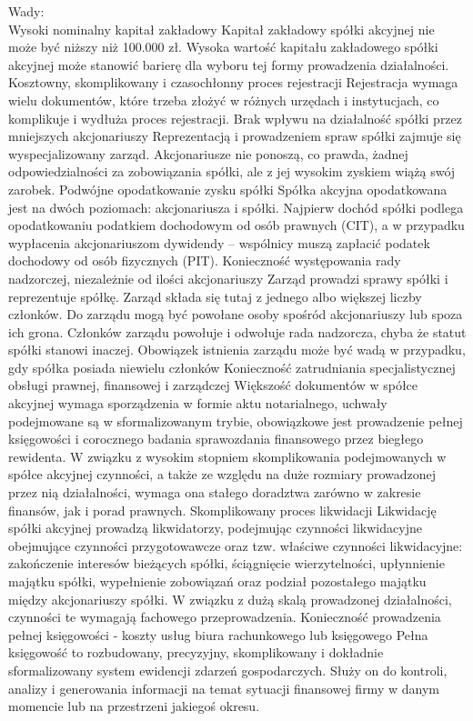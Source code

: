 \documentclass[a4paper, 11pt]{article}
\begin{document}
Wady:\\
Wysoki nominalny kapitał zakładowy
Kapitał zakładowy spółki akcyjnej nie może być niższy niż 100.000 zł. Wysoka wartość kapitału zakładowego spółki akcyjnej może stanowić barierę dla wyboru tej formy prowadzenia działalności.
Kosztowny, skomplikowany i czasochłonny proces rejestracji
Rejestracja wymaga wielu dokumentów, które trzeba złożyć w różnych urzędach i instytucjach, co komplikuje i wydłuża proces rejestracji.
Brak wpływu na działalność spółki przez mniejszych akcjonariuszy
Reprezentacją i prowadzeniem spraw spółki zajmuje się wyspecjalizowany zarząd. Akcjonariusze nie ponoszą, co prawda, żadnej odpowiedzialności za zobowiązania spółki, ale z jej wysokim zyskiem wiążą swój zarobek. 
Podwójne opodatkowanie zysku spółki
Spółka akcyjna opodatkowana jest na dwóch poziomach: akcjonariusza i spółki. Najpierw dochód spółki podlega opodatkowaniu podatkiem dochodowym od osób prawnych (CIT), a w przypadku wypłacenia akcjonariuszom dywidendy – wspólnicy muszą zapłacić podatek dochodowy od osób fizycznych (PIT).
Konieczność występowania rady nadzorczej, niezależnie od ilości 			akcjonariuszy
Zarząd prowadzi sprawy spółki i reprezentuje spółkę. Zarząd składa się tutaj z jednego albo większej liczby członków. Do zarządu mogą być powołane osoby spośród akcjonariuszy lub spoza ich grona. Członków zarządu powołuje i odwołuje rada nadzorcza, chyba że statut spółki stanowi inaczej. Obowiązek istnienia zarządu może być wadą w przypadku, gdy spółka posiada niewielu członków 
Konieczność zatrudniania specjalistycznej obsługi prawnej, 			finansowej i zarządczej
Większość dokumentów w spółce akcyjnej wymaga sporządzenia w formie aktu notarialnego, uchwały podejmowane są w sformalizowanym trybie, obowiązkowe jest prowadzenie pełnej księgowości i corocznego badania sprawozdania finansowego przez biegłego rewidenta. W związku z wysokim stopniem skomplikowania podejmowanych w spółce akcyjnej czynności, a także ze względu na duże rozmiary prowadzonej przez nią działalności, wymaga ona stałego doradztwa zarówno w zakresie finansów, jak i porad prawnych.
Skomplikowany proces likwidacji
Likwidację spółki akcyjnej prowadzą likwidatorzy, podejmując czynności likwidacyjne obejmujące czynności przygotowawcze oraz tzw. właściwe czynności likwidacyjne: zakończenie interesów bieżących spółki, ściągnięcie wierzytelności, upłynnienie majątku spółki, wypełnienie zobowiązań oraz podział pozostałego majątku między akcjonariuszy spółki. W związku z dużą skalą prowadzonej działalności, czynności te wymagają fachowego przeprowadzenia.
Konieczność prowadzenia pełnej księgowości - koszty usług biura rachunkowego lub księgowego
Pełna księgowość to rozbudowany, precyzyjny, skomplikowany i dokładnie sformalizowany system ewidencji zdarzeń gospodarczych. Służy on do kontroli, analizy i generowania informacji na temat sytuacji finansowej firmy w danym momencie lub na przestrzeni jakiegoś okresu.
\end{document}

